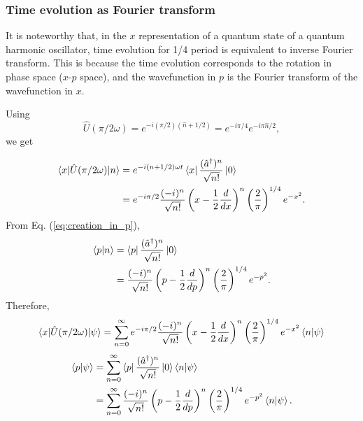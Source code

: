 \documentclass{book}
\begin{document}
\subsubsection{Time evolution as Fourier transform}
It is noteworthy that, in the $x$ representation of a quantum state of a quantum harmonic oscillator, time evolution for 1/4 period is equivalent to inverse Fourier transform. This is because the time evolution corresponds to the rotation in phase space ($x$-$p$ space), and the wavefunction in $p$ is the Fourier transform of the wavefunction in $x$. 

Using
\begin{equation}
  \hat U(\pi/2\omega) = e^{-i(\pi/2)(\hat n + 1/2)} = e^{-i\pi/4}e^{-i\pi\hat n/2},
\end{equation}
we get

\begin{equation}
  \begin{aligned}
  	\braket{x|\hat U(\pi/2\omega)|n} &= e^{-i(n+1/2)\omega t}\bra x \frac{(\hat a^\dagger)^n}{\sqrt{n!}}\ket{0}\\
  	&= e^{-i\pi/2}\frac{(-i)^n}{\sqrt{n!}}\left(x - \frac 1 2 \frac{d}{dx} \right)^n\left(\frac 2 \pi \right)^{1/4}e^{-x^2}.\\
  \end{aligned}
\end{equation}
From Eq. (\ref{eq:creation_in_p}),
\begin{equation}
  \begin{aligned}
  	\braket{p|n} &= \bra p \frac{(\hat a^\dagger)^n}{\sqrt{n!}}\ket{0}\\
  	&= \frac{(-i)^n}{\sqrt{n!}}\left(p - \frac 1 2 \frac{d}{dp} \right)^n\left(\frac 2 \pi \right)^{1/4}e^{-p^2}.\\
  \end{aligned}
\end{equation}
Therefore,
\begin{equation}
  \begin{aligned}
  	\braket{x|\hat U(\pi/2\omega)|\psi} = \sum_{n=0}^\infty e^{-i\pi/2}\frac{(-i)^n}{\sqrt{n!}}\left(x - \frac 1 2 \frac{d}{dx} \right)^n\left(\frac 2 \pi \right)^{1/4}e^{-x^2}\braket{n|\psi}\\
  	\label{eq:time-evolved_wavefunction}
  \end{aligned}
\end{equation}
\begin{equation}
  \begin{aligned}
  	\braket{p|\psi} &= \sum_{n=0}^\infty \bra p \frac{(\hat a^\dagger)^n}{\sqrt{n!}}\ket{0}\braket{n|\psi}\\
  	&= \sum_{n=0}^\infty\frac{(-i)^n}{\sqrt{n!}}\left(p - \frac 1 2 \frac{d}{dp} \right)^n\left(\frac 2 \pi \right)^{1/4}e^{-p^2}\braket{n|\psi}.\\
  	\label{eq:time-evolved_wavefunction_p}
  \end{aligned}
\end{equation}
\end{document}
